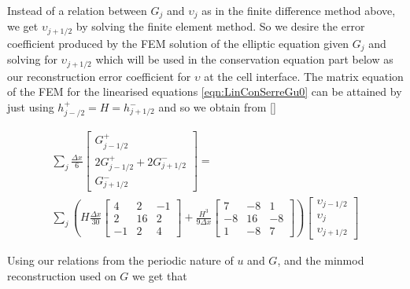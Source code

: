 Instead of a relation between $G_j$ and $\upsilon_j$ as in the finite difference method above, we get $\upsilon_{j+1/2}$ by solving the finite element method. So we desire the error coefficient produced by the FEM solution of the elliptic equation given $G_j$ and solving for $\upsilon_{j+1/2}$ which will be used in the conservation equation part below as our reconstruction error coefficient for $\upsilon$ at the cell interface. The matrix equation of the FEM for the linearised equations \eqref{eqn:LinConSerreGu0} can be attained by just using $h^+_{j-/2} = H =h^-_{j+1/2} $ and so we obtain from []

\begin{multline*}
\sum_j \frac{\Delta x}{6}\begin{bmatrix} G^+_{j -1/2} \\2 G^+_{j -1/2}+2 G^-_{j +1/2} \\ G^-_{j +1/2} \end{bmatrix} = \\\sum_j \left(H\frac{\Delta x}{30}\begin{bmatrix} 4 &2 &-1 \\2 &16 &2  \\-1 &2 &4 \end{bmatrix} + \frac{H^3 }{9\Delta x}\begin{bmatrix} 7 &-8 &1  \\-8 &16 &-8  \\1 &-8 &7  \end{bmatrix} \right) \begin{bmatrix} \upsilon_{j -1/2} \\\upsilon_{j} \\ \upsilon_{j +1/2} \end{bmatrix}
\end{multline*}

 Using our relations from the periodic nature of $u$ and $G$, and the minmod reconstruction used on $G$ we get that
 

